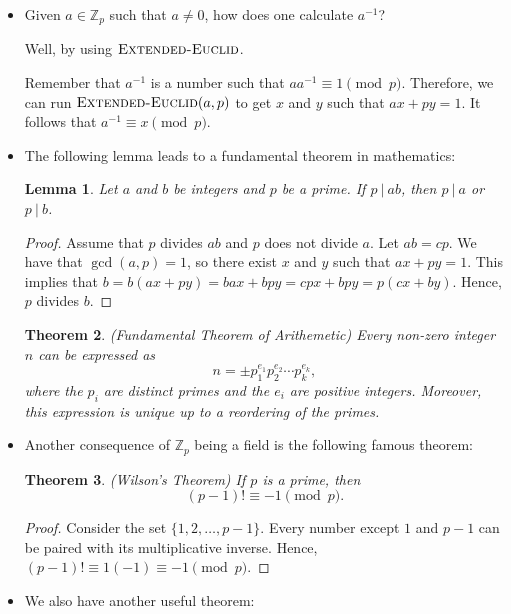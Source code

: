 \documentclass{article}
\newtheorem{lemma}{Lemma}[section]
\newtheorem{theorem}[lemma]{Theorem}
\newcommand{\divides}{\ |\ }
\begin{document}
\begin{itemize}
\item Given $a \in \mathbb{Z}_p$ such that $a \neq 0$, how does one calculate $a^{-1}$?

Well, by using $\textnormal{\scshape Extended-Euclid}$. 

Remember that $a^{-1}$ is a number such that $aa^{-1} \equiv 1 \pmod p$. Therefore, we can run $\textnormal{\scshape Extended-Euclid}(a,p)$ to get $x$ and $y$ such that $ax + py = 1$. It follows that $a^{-1} \equiv x \pmod p$.

\item The following lemma leads to a fundamental theorem in mathematics:
\begin{lemma}
Let $a$ and $b$ be integers and $p$ be a prime. If $p \divides ab$, then $p \divides a$ or $p \divides b$.
\end{lemma}
\begin{proof}
Assume that $p$ divides $ab$ and $p$ does not divide $a$. Let $ab = cp$. We have that $\gcd(a,p) = 1$, so there exist $x$ and $y$ such that $ax + py = 1$. This implies that $b = b(ax+py) = bax + bpy = cpx + bpy = p(cx+by)$. Hence, $p$ divides $b$.
\end{proof}

\begin{theorem}(Fundamental Theorem of Arithemetic)
Every non-zero integer $n$ can be expressed as $$n = \pm p_1^{e_1} p_2^{e_2} \dotsm p_k^{e_k},$$ where the $p_i$ are distinct primes and the $e_i$ are positive integers. Moreover, this expression is unique up to a reordering of the primes.
\end{theorem}

\item Another consequence of $\mathbb{Z}_p$ being a field is the following famous theorem:
\begin{theorem}(Wilson's Theorem)
If $p$ is a prime, then $$(p-1)! \equiv -1 \pmod p.$$
\end{theorem}
\begin{proof}
Consider the set $\{1, 2, \dotsc, p-1 \}$. Every number except $1$ and $p-1$ can be paired with its multiplicative inverse. Hence, $(p-1)! \equiv 1(-1) \equiv -1 \pmod p$.
\end{proof}

\item We also have another useful theorem:


\end{itemize}
\end{document}
